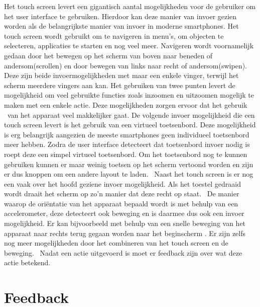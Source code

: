 Het touch screen levert een gigantisch aantal mogelijkheden voor de gebruiker om het user interface te gebruiken. Hierdoor kan deze manier van invoer gezien worden als de belangrijkste manier van invoer in moderne smartphones. Het touch screen wordt gebruikt om te navigeren in menu’s, om objecten te selecteren, applicaties te starten en nog veel meer. Navigeren wordt voornamelijk gedaan door het bewegen op het scherm van boven naar beneden of andersom(scrollen) en door bewegen van links naar recht of andersom(swipen). Deze zijn beide invoermogelijkheden met maar een enkele vinger, terwijl het scherm meerdere vingers aan kan. Het gebruiken van twee punten levert de mogelijkheid om veel gebruikte functies zoals inzoomen en uitzoomen mogelijk te maken met een enkele actie. Deze mogelijkheden zorgen ervoor dat het gebruik  van het apparaat veel makkelijker gaat. De volgende invoer mogelijkheid die een touch screen levert is het gebruik van een virtueel toetsenbord. Deze mogelijkheid is erg belangrijk aangezien de meeste smartphones geen individueel toetsenbord meer hebben. Zodra de user interface detecteert dat toetsenbord invoer nodig is roept deze een simpel virtueel toetsenbord. Om het toetsenbord nog te kunnen gebruiken kunnen er maar weinig toetsen op het scherm vertoond worden en zijn er dus knoppen om een andere layout te laden.  Naast het touch screen is er nog een vaak over het hoofd geziene invoer mogelijkheid. Als het toestel gedraaid wordt draait het scherm op zo’n manier dat deze recht op staat.  De manier waarop de oriëntatie van het apparaat bepaald wordt is met behulp van een accelerometer, deze detecteert ook beweging en is daarmee dus ook een invoer mogelijkheid. Er kan bijvoorbeeld met behulp van een snelle beweging van het apparaat naar rechts terug gegaan worden naar het beginscherm . Er zijn zelfs nog meer mogelijkheden door het combineren van het touch screen en de beweging.  Nadat een actie uitgevoerd is moet er feedback zijn over wat deze actie betekend. 

\section{Feedback}

